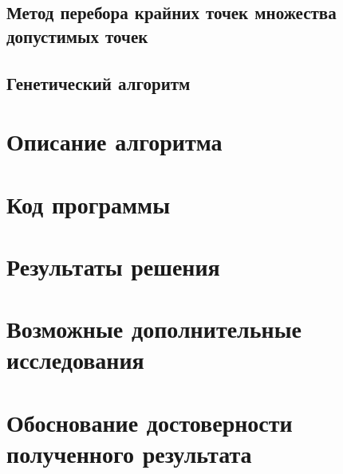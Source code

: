 \documentclass[10pt,a4paper,titlepage]{article}
\begin{document}
\subsection{Метод перебора крайних точек множества допустимых точек}
\subsection{Генетический алгоритм}

\section{Описание алгоритма}
\section{Код программы}
\section{Результаты решения}
\section{Возможные дополнительные исследования}
\section{Обоснование достоверности полученного результата}
\end{document}

